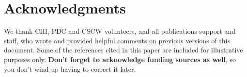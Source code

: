\documentclass{article}
\begin{document}
\section{Acknowledgments}

We thank CHI, PDC and CSCW volunteers, and all publications support
and staff, who wrote and provided helpful comments on previous
versions of this document.  Some of the references cited in this paper
are included for illustrative purposes only.  \textbf{Don't forget
to acknowledge funding sources as well}, so you don't wind up
having to correct it later.

%
%
%
%
%
\balance

\end{document}
